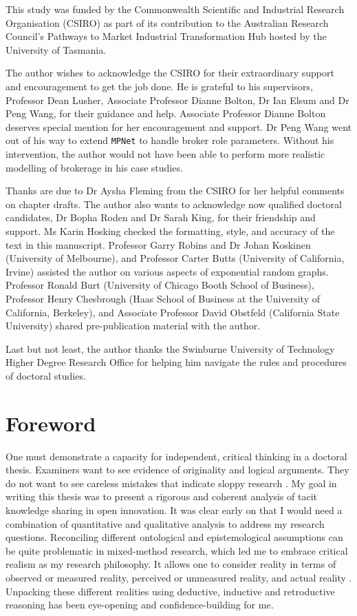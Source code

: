 \documentclass[12pt,table,xcdraw]{book}
\begin{document}
This study was funded by the Commonwealth Scientific and Industrial Research Organisation (CSIRO) as part of its contribution to the Australian Research Council's Pathways to Market Industrial Transformation Hub hosted by the University of Tasmania. \medskip

\noindent
The author wishes to acknowledge the CSIRO for their extraordinary support and encouragement to get the job done. He is grateful to his supervisors, Professor Dean Lusher, Associate Professor Dianne Bolton, Dr Ian Elsum and Dr Peng Wang, for their guidance and help. Associate Professor Dianne Bolton deserves special mention for her encouragement and support. Dr Peng Wang went out of his way to extend \texttt{MPNet} to handle broker role parameters. Without his intervention, the author would not have been able to perform more realistic modelling of brokerage in his case studies. \medskip

Thanks are due to Dr Aysha Fleming from the CSIRO for her helpful comments on chapter drafts. The author also wants to acknowledge now qualified doctoral candidates, Dr Bopha Roden and Dr Sarah King, for their friendship and support. Ms Karin Hosking checked the formatting, style, and accuracy of the text in this manuscript. Professor Garry Robins and Dr Johan Koskinen (University of Melbourne), and Professor Carter Butts (University of California, Irvine) assisted the author on various aspects of exponential random graphs. Professor Ronald Burt (University of Chicago Booth School of Business), Professor Henry Chesbrough (Haas School of Business at the University of California, Berkeley), and Associate Professor David Obstfeld (California State University) shared pre-publication material with the author.  \medskip

Last but not least, the author thanks the Swinburne University of Technology Higher Degree Research Office for helping him navigate the rules and procedures of doctoral studies.

\chapter*{Foreword}

One must demonstrate a capacity for independent, critical thinking in a doctoral thesis. Examiners want to see evidence of originality and logical arguments. They do not want to see careless mistakes that indicate sloppy research \citep{mullins2002its}. My goal in writing this thesis was to present a rigorous and coherent analysis of tacit knowledge sharing in open innovation. It was clear early on that I would need a combination of quantitative and qualitative analysis to address my research questions. Reconciling different ontological and epistemological assumptions can be quite problematic in mixed-method research, which led me to embrace critical realism as my research philosophy. It allows one to consider reality in terms of observed or measured reality, perceived or unmeasured reality, and actual reality \citep{bhaskar2013realist}. Unpacking these different realities using deductive, inductive and retroductive reasoning has been eye-opening and confidence-building for me. \medskip
\end{document}
